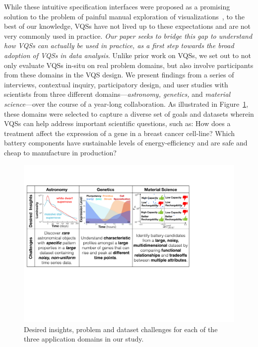  \par While these intuitive specification interfaces were proposed as a promising solution
 to the problem of painful manual exploration of visualizations~\cite{ryall2005querylines,wattenberg2001sketching},
 to the best of our knowledge, VQSs have not lived up to these expectations and are not very commonly used in practice.
 {\em Our paper seeks to bridge this gap
 to understand how VQSs can actually be used in practice,
 as a first step towards the broad adoption of VQSs in data analysis}.
 Unlike prior work on VQSs,
 we set out to not only evaluate VQSs in-situ on
 real problem domains, but also involve participants
 from these domains in the VQS design.
 We present findings from a series of interviews,
 contextual inquiry, participatory design,
 and user studies with scientists from three different domains---{\em astronomy, genetics,} and {\em material science}---over the course of
 a year-long collaboration. As illustrated in Figure~\ref{science_goal}, these domains were selected to capture
 a diverse set of goals
 and datasets wherein VQSs can help address
 important scientific questions, such as:
 How does a treatment affect the expression
 of a gene in a breast cancer cell-line?
 Which battery components have sustainable
 levels of energy-efficiency and are safe and
 cheap to manufacture in production?
 \begin{figure}[ht!]
 	\centering
 	\includegraphics[width=\linewidth]{figures/science_goal.pdf}
 	\caption{Desired insights, problem and dataset challenges for each of the three application domains in our study.}
 	\label{science_goal}
 	\vspace*{-15pt}
 \end{figure}
